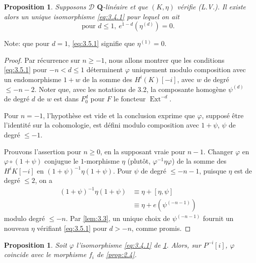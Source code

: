 \documentclass[11pt,a4paper]{article}
\theoremstyle{plain}
\newtheorem{proposition}[theorem]{Proposition}
\theoremstyle{definition}
\DeclareMathOperator{\Ext}{Ext}
\newcommand{\cD}{\mathscr{D}}
\newcommand{\bQ}{\mathbf{Q}}
\begin{document}
\begin{proposition}\label{prop:3.5}
Supposons $\cD$ $\bQ$-lin\'eaire et que $(K,\eta)$ v\'erifie (L.V.). Il existe alors un unique isomorphisme \eqref{eq:3.4.1} pour lequel on ait
\begin{equation}\label{eq:3.5.1}
\text{pour } d \leqslant 1,\ e^{1-d}(\eta^{(d)}) = 0.
\end{equation}
\end{proposition}

Note: que pour $d=1$, \eqref{eq:3.5.1} signifie que $\eta^{(1)} = 0$.

\begin{proof}
Par r\'ecurrence sur $n \geqslant -1$, nous allons montrer que les conditions \eqref{eq:3.5.1} pour $-n < d \leqslant 1$ d\'eterminent $\varphi$ uniquement modulo composition avec un endomorphisme $1+w$ de la somme des $H^i(K)[-i]$, avec $w$ de degr\'e $\leqslant -n-2$. Noter que, avec les notations de 3.2, la composante homog\`ene $\psi^{(d)}$ de degr\'e $d$ de $w$ est dans $F_0^d$ pour $F$ le foncteur $\Ext^{-d}$.

Pour $n=-1$, l'hypoth\`ese est vide et la conclusion exprime que $\varphi$, suppos\'e \^etre l'identit\'e sur la cohomologie, est d\'efini modulo composition avec $1+\psi$, $\psi$ de degr\'e $\leqslant -1$.

Prouvons l'assertion pour $n \geqslant 0$, en la supposant vraie pour $n-1$. Changer $\varphi$ en $\varphi \circ (1+\psi)$ conjugue le $1$-morphisme $\eta$ (plut\^ot, $\varphi^{-1}\eta\varphi$) de la somme des $H^iK[-i]$ en $(1+\psi)^{-1}\eta(1+\psi)$. Pour $\psi$ de degr\'e $\leqslant -n-1$, puisque $\eta$ est de degr\'e $\leqslant 2$, on a
\begin{align*}
(1+\psi)^{-1}\eta(1+\psi) &\equiv \eta + [\eta,\psi] \\
&\equiv \eta + e(\psi^{(-n-1)})
\end{align*}
modulo degr\'e $\leqslant -n$. Par \ref{lem:3.3}, un unique choix de $\psi^{(-n-1)}$ fournit un nouveau $\eta$ v\'erifiant \eqref{eq:3.5.1} pour $d > -n$, comme promis.
\end{proof}

\begin{proposition}\label{prop:3.6}
Soit $\varphi$ l'isomorphisme \eqref{eq:3.4.1} de \ref{prop:3.5}. Alors, sur $P^{-i}[i]$, $\varphi$ coincide avec le morphisme $f_i$ de \ref{prop:2.4}.
\end{proposition}
\end{document}

